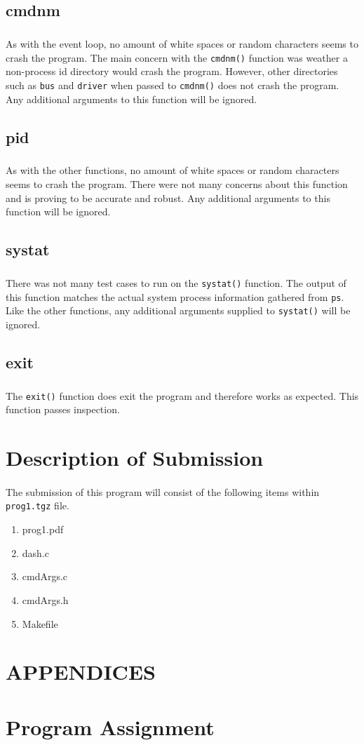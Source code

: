 \documentclass[10pt]{article}
\begin{document}
\subsection{cmdnm}
\subparagraph{}
As with the event loop, no amount of white spaces or random characters seems to crash the program. The main concern with the \texttt{cmdnm()} function was weather a non-process id directory would crash the program. However, other directories such as \texttt{bus} and \texttt{driver} when passed to \texttt{cmdnm()} does not crash the program. Any additional arguments to this function will be ignored.

\subsection{pid}
\subparagraph{}
As with the other functions, no amount of white spaces or random characters seems to crash the program. There were not many concerns about this function and is proving to be accurate and robust. Any additional arguments to this function will be ignored.

\subsection{systat}
\subparagraph{}
There was not many test cases to run on the \texttt{systat()} function. The output of this function matches the actual system process information gathered from \texttt{ps}. Like the other functions, any additional arguments supplied to \texttt{systat()} will be ignored. 

\subsection{exit}
\subparagraph{}
The \texttt{exit()} function does exit the program and therefore works as expected. This function passes inspection.
\newpage

\section{Description of Submission}
\paragraph{}
The submission of this program will consist of the following items within \texttt{prog1.tgz} file.

\begin{enumerate}[noitemsep]
\item prog1.pdf
\item dash.c
\item cmdArgs.c
\item cmdArgs.h
\item Makefile
\end{enumerate}

\vfill
\section{APPENDICES}
\appendix

\section{Program Assignment}

\end{document}
